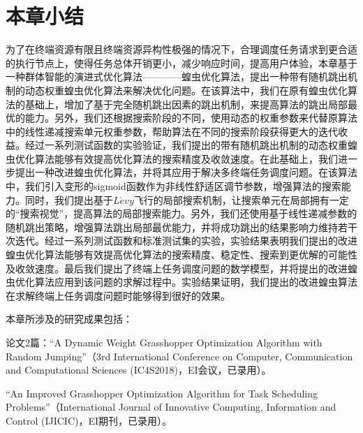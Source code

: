 \section{本章小结}\label{sec:task_scheduling_summary}

为了在终端资源有限且终端资源异构性极强的情况下，合理调度任务请求到更合适的执行节点上，使得任务总体开销更小，减少响应时间，提高用户体验，本章基于一种群体智能的演进式优化算法————蝗虫优化算法，提出一种带有随机跳出机制的动态权重蝗虫优化算法来解决优化问题。在该算法中，我们在原有蝗虫优化算法的基础上，增加了基于完全随机跳出因素的跳出机制，来提高算法的跳出局部最优的能力。另外，我们还根据搜索阶段的不同，使用动态的权重参数来代替原算法中的线性递减搜索单元权重参数，帮助算法在不同的搜索阶段获得更大的迭代收益。经过一系列测试函数的实验验证，我们提出的带有随机跳出机制的动态权重蝗虫优化算法能够有效提高优化算法的搜索精度及收敛速度。在此基础上，我们进一步提出一种改进蝗虫优化算法，并将其应用于解决多终端任务调度问题。在该算法中，我们引入变形的sigmoid函数作为非线性舒适区调节参数，增强算法的搜索能力。同时，我们提出基于$L\acute{e}vy$飞行的局部搜索机制，让搜索单元在局部拥有一定的“搜索视觉”，提高算法的局部搜索能力。另外，我们还使用基于线性递减参数的随机跳出策略，增强算法跳出局部最优能力，并将成功跳出的结果影响力维持若干次迭代。经过一系列测试函数和标准测试集的实验，实验结果表明我们提出的改进蝗虫优化算法能够有效提高优化算法的搜索精度、稳定性、搜索到更优解的可能性及收敛速度。最后我们提出了终端上任务调度问题的数学模型，并将提出的改进蝗虫优化算法应用到该问题的求解过程中。实验结果证明，我们提出的改进蝗虫算法在求解终端上任务调度问题时能够得到很好的效果。

本章所涉及的研究成果包括：

论文2篇：“A Dynamic Weight Grasshopper Optimization Algorithm with Random Jumping”（3rd International Conference on Computer, Communication and Computational Sciences (IC4S2018)，EI会议，已录用）。

“An Improved Grasshopper Optimization Algorithm for Task Scheduling Problems”（International Journal of Innovative Computing, Information and Control (IJICIC)，EI期刊，已录用）。